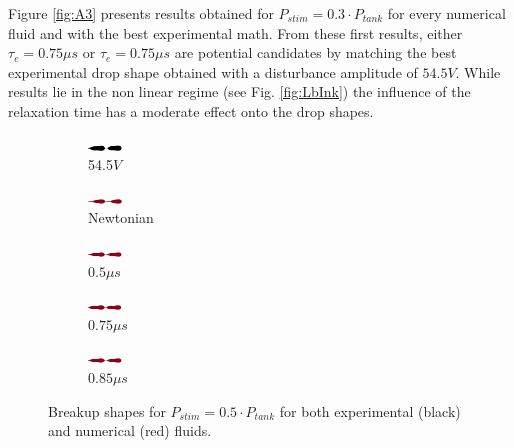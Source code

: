 \documentclass[twocolumn,10pt]{asme2ej}
\begin{document}
Figure \ref{fig:A3} presents results obtained for $P_{stim}=0.3\cdot P_{tank}$ for every numerical fluid and with the best experimental math. From these first results, either $\tau_e = 0.75 \mu s$  or $\tau_e = 0.75 \mu s$ are potential candidates by matching the best experimental drop shape obtained with a  disturbance amplitude of $54.5V$. While results lie in the non linear regime (see Fig. \ref{fig:LbInk}) the influence of the relaxation time has a moderate effect onto the drop shapes.

\begin{figure}[]

    \begin{subfigure}[t]{1.6cm}
        \centering
        \includegraphics[angle=-90,origin=c,width=0.9cm]{Encre/exp_A5.png}        
        \caption{54.5$V$}
    \end{subfigure}
    \hfill
    \begin{subfigure}[t]{1.7cm}
        \centering
        \includegraphics[angle=-90,origin=c,width=0.9cm]{Encre/0_A5.png}

        \caption{Newtonian}
    \end{subfigure}
    \hfill
    \begin{subfigure}[t]{1.6cm}
        \centering
        \includegraphics[angle=-90,origin=c,width=0.9cm]{Encre/05_A5.png}
        \caption{$0.5\mu s$}
    \end{subfigure}\hfill
    \begin{subfigure}[t]{1.6cm}
        \centering
        \includegraphics[angle=-90,origin=c,width=0.9cm]{Encre/075_A5.png}
        \caption{$0.75\mu s$}
    \end{subfigure}
    \hfill
    \begin{subfigure}[t]{1.6cm}
        \centering
        \includegraphics[angle=-90,origin=c,width=0.9cm]{Encre/085_A5.png}
        \caption{$0.85\mu s$}
    \end{subfigure}
    \caption{Breakup shapes for $P_{stim}=0.5\cdot P_{tank}$ for both experimental (black) and numerical (red) fluids.}
    \label{fig:A5}
\end{figure}
\end{document}
